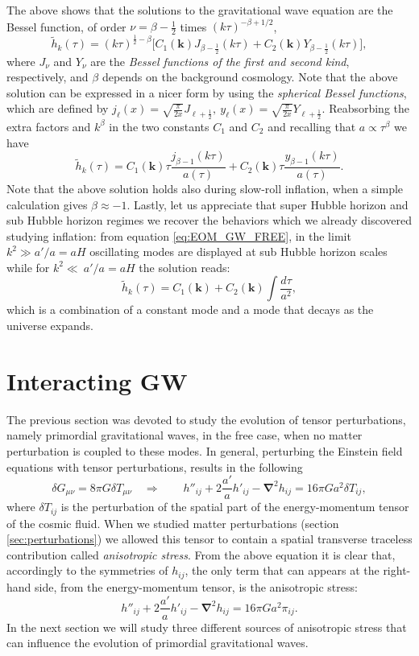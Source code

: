 The above shows that the solutions to the gravitational wave equation are the Bessel function, of order $\nu=\beta-\tfrac12$ times $(k\tau)^{-\beta+1/2}$,
$$\tilde h_k(\tau)=(k\tau)^{\frac{1}{2}-\beta}\bigg[C_1(\mathbf{k}) J_{\beta-\frac{1}{2}}(k\tau)+C_2(\mathbf{k}) Y_{\beta-\frac{1}{2}}(k\tau)\bigg],$$
where $J_\nu$ and $Y_\nu$ are the \emph{Bessel functions of the first and second kind}, respectively, and $\beta$ depends on the background cosmology. Note that the above solution can be expressed in a nicer form by using the \emph{spherical Bessel functions}, which are defined by $j_\ell(x)=\sqrt{\frac{\pi}{2x}}J_{\ell+\frac{1}{2}},\ y_\ell(x)=\sqrt{\frac{\pi}{2x}}Y_{\ell+\frac{1}{2}}$. Reabsorbing the extra factors and $k^{\beta}$ in the two constants $C_1$ and $C_2$ and recalling that $a\propto\tau^{\beta}$ we have
\begin{equation}
    \label{eq:free_GW_sol}
    \tilde h_k(\tau)=C_1(\mathbf{k})\tau\frac{j_{\beta-1}(k\tau)}{a(\tau)}+C_2(\mathbf{k})\tau\frac{y_{\beta-1}(k\tau)}{a(\tau)}.
\end{equation}
Note that the above solution holds also during slow-roll inflation, when a simple calculation gives $\beta\approx-1$. Lastly, let us appreciate that super Hubble horizon and sub Hubble horizon regimes we recover the behaviors which we already discovered studying inflation: from equation \eqref{eq:EOM_GW_FREE}, in the limit $k^2\gg a'/a=a H$ oscillating modes are displayed at sub Hubble horizon scales while for $k^2\ll\ a'/a=a H$ the solution reads:
$$\tilde h_k(\tau)=C_1(\mathbf k)+C_2(\mathbf k)\int\frac{d\tau}{a^2},$$ which is a combination of a constant mode and a mode that decays as the universe expands.
\section{Interacting GW}
The previous section was devoted to study the evolution of tensor perturbations, namely primordial gravitational waves, in the free case, when no matter perturbation is coupled to these modes.
In general, perturbing the Einstein field equations with tensor perturbations, results in the following
$$\delta G_{\mu\nu}=8\pi G\delta T_{\mu\nu}\quad \Rightarrow\qquad h''_{ij}+2\frac{a'}{a}h'_{ij}-\boldsymbol{\nabla}^2 h_{ij}=16\pi G a^2\delta T_{ij},$$
where $\delta T_{ij}$ is the perturbation of the spatial part of the energy-momentum tensor of the cosmic fluid. When we studied matter perturbations (section \ref{sec:perturbations}) we allowed this tensor to contain a spatial transverse traceless contribution called \emph{anisotropic stress}. From the above equation it is clear that, accordingly to the symmetries of $h_{ij}$, the only term that can appears at the right-hand side, from the energy-momentum tensor, is the anisotropic stress:
\begin{equation}
    h''_{ij}+2\frac{a'}{a}h'_{ij}-\boldsymbol{\nabla}^2 h_{ij}=16\pi G a^2\pi_{ij}.\label{eq:GW_EOM_stress}
\end{equation}
In the next section we will study three different sources of anisotropic stress that can influence the evolution of primordial gravitational waves.
